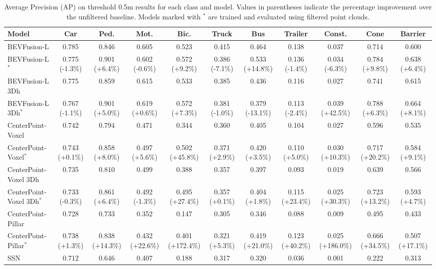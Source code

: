 
\begin{table}[htpb]
    \caption{Average Precision (AP) on threshold 0.5m results for each class and model. Values in parentheses indicate the percentage improvement over the unfiltered baseline. Models marked with $^*$ are trained and evaluated using filtered point clouds.}
    \centering
    \begin{tabular}{lcccccccccc}
    \midrule
    Model & Car & Ped. & Mot. & Bic. & Truck & Bus & Trailer & Const. & Cone & Barrier \\
    \midrule
    BEVFusion-L & 0.785 & 0.846 & 0.605 & 0.523 & 0.415 & 0.464 & 0.138 & 0.037 & 0.714 & 0.600 \\
    BEVFusion-L$^*$ & 0.775 (-1.3\%) & 0.901 (+6.4\%) & 0.602 (-0.6\%) & 0.572 (+9.2\%) & 0.386 (-7.1\%) & 0.533 (+14.8\%) & 0.136 (-1.4\%) & 0.034 (-6.3\%) & 0.784 (+9.8\%) & 0.638 (+6.4\%) \\
    \midrule
    BEVFusion-L 3Dh & 0.775 & 0.859 & 0.615 & 0.533 & 0.385 & 0.436 & 0.116 & 0.027 & 0.741 & 0.615 \\
    BEVFusion-L 3Dh$^*$ & 0.767 (-1.1\%) & 0.901 (+5.0\%) & 0.619 (+0.6\%) & 0.572 (+7.3\%) & 0.381 (-1.0\%) & 0.379 (-13.1\%) & 0.113 (-2.4\%) & 0.039 (+42.5\%) & 0.788 (+6.3\%) & 0.664 (+8.1\%) \\
    \midrule
    CenterPoint-Voxel & 0.742 & 0.794 & 0.471 & 0.344 & 0.360 & 0.405 & 0.104 & 0.027 & 0.596 & 0.535 \\
    CenterPoint-Voxel$^*$ & 0.743 (+0.1\%) & 0.858 (+8.0\%) & 0.497 (+5.6\%) & 0.502 (+45.8\%) & 0.371 (+2.9\%) & 0.420 (+3.5\%) & 0.110 (+5.0\%) & 0.030 (+10.3\%) & 0.717 (+20.2\%) & 0.584 (+9.1\%) \\
    \midrule
    CenterPoint-Voxel 3Dh & 0.735 & 0.810 & 0.499 & 0.388 & 0.357 & 0.397 & 0.093 & 0.019 & 0.639 & 0.566 \\
    CenterPoint-Voxel 3Dh$^*$ & 0.733 (-0.3\%) & 0.861 (+6.4\%) & 0.492 (-1.3\%) & 0.495 (+27.4\%) & 0.357 (+0.1\%) & 0.404 (+1.8\%) & 0.115 (+23.4\%) & 0.025 (+30.3\%) & 0.723 (+13.2\%) & 0.593 (+4.7\%) \\
    \midrule
    CenterPoint-Pillar & 0.728 & 0.733 & 0.352 & 0.147 & 0.305 & 0.346 & 0.088 & 0.009 & 0.495 & 0.433 \\
    CenterPoint-Pillar$^*$ & 0.738 (+1.3\%) & 0.838 (+14.3\%) & 0.432 (+22.6\%) & 0.401 (+172.4\%) & 0.321 (+5.3\%) & 0.419 (+21.0\%) & 0.123 (+40.2\%) & 0.025 (+186.0\%) & 0.666 (+34.5\%) & 0.507 (+17.1\%) \\
    \midrule
    SSN & 0.712 & 0.646 & 0.407 & 0.188 & 0.317 & 0.320 & 0.036 & 0.001 & 0.222 & 0.313 \\

\end{tabular}
\end{table}
